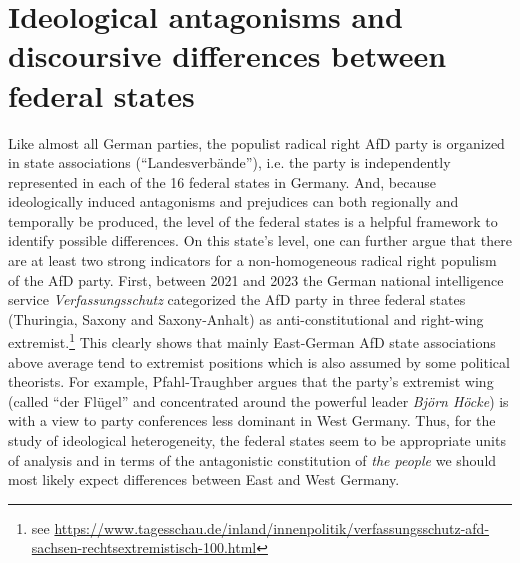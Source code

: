 \documentclass[a4paper]{scrreprt}
\begin{document}
\section{Ideological antagonisms and discoursive differences between federal states}
Like almost all German parties, the populist radical right AfD party is organized in state associations (``Landesverbände''), i.e. the party is independently represented in each of the 16 federal states in Germany. And, because ideologically induced antagonisms and prejudices can both regionally and temporally be produced, the level of the federal states is a helpful framework to identify possible differences. On this state's level, one can further argue that there are at least two strong indicators for a non-homogeneous radical right populism of the AfD party. First, between 2021 and 2023 the German national intelligence service {\em Verfassungsschutz} categorized the AfD party in three federal states (Thuringia, Saxony and Saxony-Anhalt) as anti-constitutional and right-wing extremist.\footnote{see \url{https://www.tagesschau.de/inland/innenpolitik/verfassungsschutz-afd-sachsen-rechtsextremistisch-100.html}} This clearly shows that mainly East-German AfD state associations above average tend to extremist positions which is also assumed by some political theorists. For example, Pfahl-Traughber argues that the party's extremist wing (called ``der Flügel'' and concentrated around the powerful leader {\em Björn Höcke}) is with a view to party conferences less dominant in West Germany. \cite[p.~37]{pfahl:2019} Thus, for the study of ideological heterogeneity, the federal states seem to be appropriate units of analysis and in terms of the antagonistic constitution of {\em the people} we should most likely expect differences between East and West Germany.\par
\end{document}

